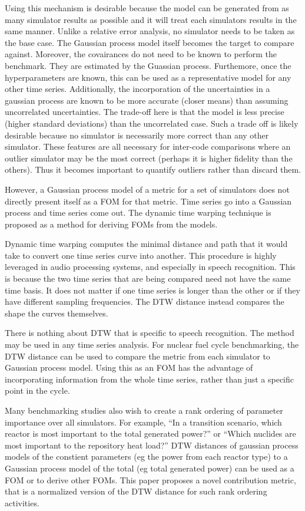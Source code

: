 Using this mechanism is desirable because the model can be generated
from as many simulator results as possible and it will treat each simulators
results in the same manner. Unlike a relative error analysis, no simulator
needs to be taken as the base case. The Gaussian process model itself becomes
the target to compare against. 
Moreover, the covairances do not need to be known to perform the benchmark.
They are estimated by the Guassian process. Furthemore, once the 
hyperparameters are known, this can be used as a representative model for 
any other time series. Additionally, the incorporation of the uncertainties
in a gaussian process are known to be more accurate (closer means) than 
assuming uncorrelated uncertainties.  The trade-off here is that the 
model is less precise (higher standard deviations) than the uncorrelated 
case. Such a trade off is likely desirable because no simulator is 
necessarily more correct than any other simulator. These features are all 
necessary for inter-code comparisons where an outlier simulator may be the 
most correct (perhaps it is higher fidelity than the others). Thus it
becomes important to quantify outliers rather than discard them.

However, a Gaussian process model of a metric for a set of simulators 
does not directly present itself as a FOM for that metric. Time series go 
into a Gaussian process and time series come out. The dynamic time warping 
technique is proposed as a method for deriving FOMs from the models.  

Dynamic time warping computes the minimal distance and path that it would 
take to convert one time series curve into another. This procedure is highly 
leveraged in audio processing systems, and especially in speech recognition.
This is because the two time series that are being compared need not have
the same time basis.  It does not matter if one time series is longer than 
the other or if they have different sampling frequencies. The DTW distance
instead compares the shape the curves themselves. 

There is nothing about DTW that is specific to speech recognition. The method
may be used in any time series analysis. For nuclear fuel cycle benchmarking,
the DTW distance can be used to compare the metric from each simulator to 
Gaussian process model. Using this as an FOM has the advantage of 
incorporating information from the whole time series, rather than just a 
specific point in the cycle.

Many benchmarking studies also wish to create a rank ordering of parameter
importance over all simulators.  For example, ``In a transition scenario,
which reactor is most important to the total generated power?'' or ``Which
nuclides are most important to the repository heat load?'' DTW distances 
of gaussian process models of the constient parameters (eg the power from
each reactor type) to a Gaussian process model of the total (eg total 
generated power) can be used as a FOM or to derive other FOMs. This paper
proposes a novel contribution metric, that is a normalized version of the DTW 
distance for such rank ordering activities.

